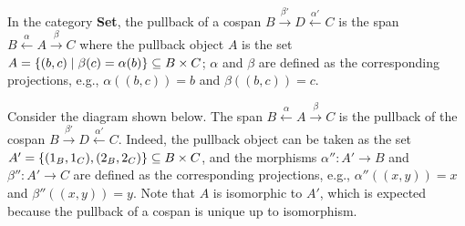 \begin{example} 
    \label{ex:cat:pbfsdljkgjasssss}
    In the category \textbf{Set},
    the pullback 
    of a cospan \(B \overset{\beta'}{\rightarrow} D \overset{\alpha'}{\leftarrow} C \) is the span \( B \overset{\alpha}{\leftarrow} A \overset{\beta}{\rightarrow} C \) where
    the pullback object $A$ is the set $A = \{(b,c) \mid \beta (c) = \alpha (b)\} \subseteq B \times C$; $\alpha$ and $\beta$ are defined as the corresponding projections, e.g., $\alpha((b, c)) = b$ and $\beta((b, c)) = c$.

    Consider the diagram shown below. 
    The span \( B \overset{\alpha}{\leftarrow} A \overset{\beta}{\rightarrow} C \)
    is the pullback of the cospan \(B \overset{\beta'}{\rightarrow} D \overset{\alpha'}{\leftarrow} C \).
    Indeed, the pullback object can be taken as the set $A' = \{(1_B,1_C),(2_B,2_C)\} \subseteq B \times C$, and the morphisms $\alpha'' \colon A' \to B$ and $\beta'' \colon A' \to C$ are defined as the corresponding projections, e.g., $\alpha''((x,y)) = x$ and $\beta''((x,y)) = y$. Note that $A$ is isomorphic to $A'$, which is expected because the pullback of a cospan is unique up to isomorphism.
    \begin{center}
\end{center}
\end{example}
